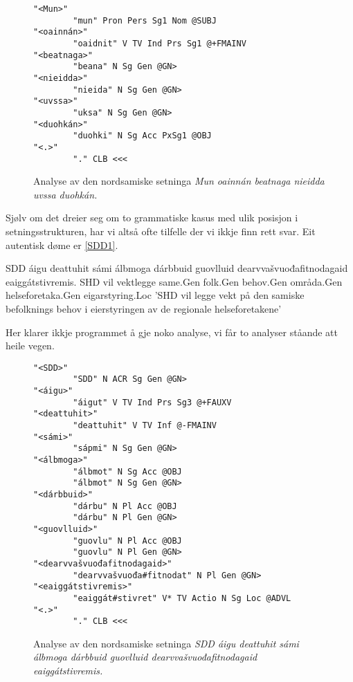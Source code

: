 \documentclass[a4paper,nynorsk]{article}
\begin{document}
\begin{figure}[htbp]
\begin{center}
\begin{verbatim}
"<Mun>"
        "mun" Pron Pers Sg1 Nom @SUBJ
"<oainnán>"
        "oaidnit" V TV Ind Prs Sg1 @+FMAINV
"<beatnaga>"
        "beana" N Sg Gen @GN>
"<nieidda>"
        "nieida" N Sg Gen @GN>
"<uvssa>"
        "uksa" N Sg Gen @GN>
"<duohkán>"
        "duohki" N Sg Acc PxSg1 @OBJ
"<.>"
        "." CLB <<<
\end{verbatim}
\caption{Analyse av den nordsamiske setninga \textit{Mun oainnán beatnaga nieidda uvssa duohkán.}}
\label{beatnaga}
\end{center}
\end{figure}

Sjølv om det dreier seg om to grammatiske kasus med ulik posisjon i setningsstrukturen, har vi altså ofte tilfelle der vi ikkje finn rett svar. Eit autentisk døme er \ref{SDD1}. %

 \begin{example}\label{SDD1}
\gll SDD áigu deattuhit sámi álbmoga dárbbuid guovlluid dearvvašvuođafitnodagaid eaiggátstivremis.
      SHD vil vektlegge same.Gen folk.Gen behov.Gen områda.Gen helseforetaka.Gen eigarstyring.Loc
\glt  'SHD vil legge vekt på den samiske befolknings behov i eierstyringen av de regionale helseforetakene'
\glend
\end{example}

Her klarer ikkje programmet å gje noko analyse, vi får to analyser ståande att heile vegen. %

\begin{figure}[htbp]
\begin{center}
\begin{verbatim}
"<SDD>"
        "SDD" N ACR Sg Gen @GN>
"<áigu>"
        "áigut" V TV Ind Prs Sg3 @+FAUXV
"<deattuhit>"
        "deattuhit" V TV Inf @-FMAINV
"<sámi>"
        "sápmi" N Sg Gen @GN>
"<álbmoga>"
        "álbmot" N Sg Acc @OBJ
        "álbmot" N Sg Gen @GN>
"<dárbbuid>"
        "dárbu" N Pl Acc @OBJ
        "dárbu" N Pl Gen @GN>
"<guovlluid>"
        "guovlu" N Pl Acc @OBJ
        "guovlu" N Pl Gen @GN>
"<dearvvašvuođafitnodagaid>"
        "dearvvašvuođa#fitnodat" N Pl Gen @GN>
"<eaiggátstivremis>"
        "eaiggát#stivret" V* TV Actio N Sg Loc @ADVL
"<.>"
        "." CLB <<<
\end{verbatim}
\caption{Analyse av den nordsamiske setninga \textit{SDD áigu deattuhit sámi álbmoga dárbbuid guovlluid dearvvašvuođafitnodagaid eaiggátstivremis.}}
\label{SDD1-a}
\end{center}
\end{figure}
\end{document}
